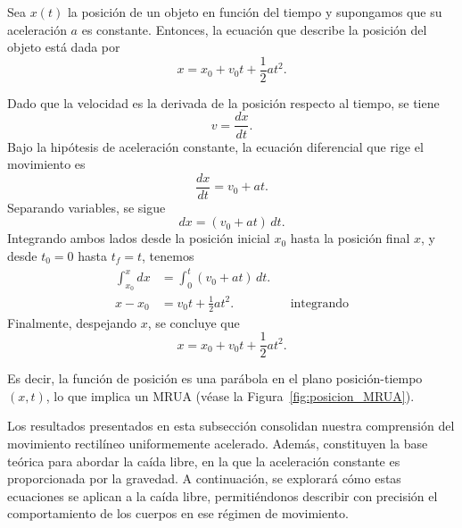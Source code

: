 \begin{proposition}{}{}
    Sea $x(t)$ la posición de un objeto en función del tiempo y supongamos que su aceleración $a$ es constante. Entonces, la ecuación que describe la posición del objeto está dada por
    $$x = x_0 + v_0 t + \frac{1}{2} a t^2.$$
    \begin{demo}
        Dado que la velocidad es la derivada de la posición respecto al tiempo, se tiene
        $$v = \frac{dx}{dt}.$$
        Bajo la hipótesis de aceleración constante, la ecuación diferencial que rige el movimiento es
        $$\frac{dx}{dt} = v_0 + at.$$
        Separando variables, se sigue
        $$dx = (v_0 + at) \, dt.$$
        Integrando ambos lados desde la posición inicial $x_0$ hasta la posición final $x$, y desde $t_0 = 0$ hasta $t_f = t$, tenemos
        \begin{align*}
            \int_{x_0}^{x} dx & = \int_0^t (v_0 + at) \, dt. \\
            x - x_0 & = v_0 t + \frac{1}{2} a t^2. &&\text{integrando}
        \end{align*}
        Finalmente, despejando $x$, se concluye que
        $$x = x_0 + v_0 t + \frac{1}{2} a t^2.$$
        
        Es decir, la función de posición es una parábola en el plano posición-tiempo $(x, t)$, lo que implica un MRUA (véase la Figura~\ref{fig:posicion_MRUA}).
    \end{demo}
\end{proposition}

Los resultados presentados en esta subsección consolidan nuestra comprensión del movimiento rectilíneo uniformemente acelerado. Además, constituyen la base teórica para abordar la caída libre, en la que la aceleración constante es proporcionada por la gravedad. A continuación, se explorará cómo estas ecuaciones se aplican a la caída libre, permitiéndonos describir con precisión el comportamiento de los cuerpos en ese régimen de movimiento.

